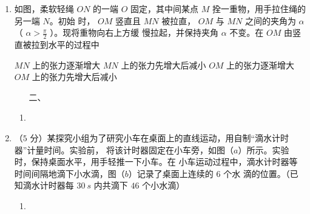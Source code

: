 \begin{enumerate}
{}



\item
如图，柔软轻绳 $ ON $ 的一端 $ O $ 固定，其中间某点 $ M $ 拴一重物，用手拉住绳的另一端 $ N $。初始
时， $ OM $ 竖直且 $ MN $ 被拉直， $ OM $ 与 $ MN $ 之间的夹角为 $ \alpha $ （ $ \alpha >\frac{\pi}{2} $
）。现将重物向右上方缓
慢拉起，并保持夹角 $ \alpha $ 不变。在 $ OM $ 由竖直被拉到水平的过程中  
\begin{figure}[h!]
\centering

\end{figure}


\fourchoices
{$ MN $ 上的张力逐渐增大}
{$ MN $ 上的张力先增大后减小}
{$ OM $ 上的张力逐渐增大}
{$ OM $ 上的张力先增大后减小}


\banswer{

}


\newpage
\begin{enumerate}[leftmargin=0em]
\renewcommand{\labelenumii}{}
\item[二、]

\end{enumerate}

\begin{enumerate}[leftmargin=-2em]
\renewcommand{\labelenumii}{}
\item
{}
\end{enumerate} 



\item
（$ 5 $ 分）某探究小组为了研究小车在桌面上的直线运动，用自制“滴水计时器”计量时间。实验前，
将该计时器固定在小车旁，如图（$ a $）所示。实验时，保持桌面水平，用手轻推一下小车。在
小车运动过程中，滴水计时器等时间间隔地滴下小水滴，图（$ b $）记录了桌面上连续的 $ 6 $ 个水
滴的位置。（已知滴水计时器每 $ 30 \ s $ 内共滴下 $ 46 $ 个小水滴）
\begin{figure}[h!]
\centering

\end{figure}

\begin{enumerate}
\renewcommand{\labelenumi}{\arabic{enumi}.}
\item


\end{enumerate}
\end{enumerate}
